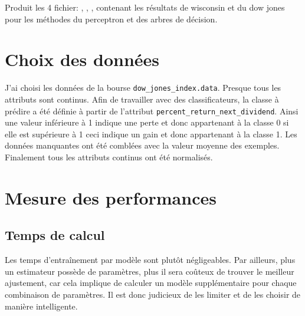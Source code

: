 \documentclass[10pt,letterpaper]{article}
\begin{document}
Produit les 4 fichier: , , ,  contenant les résultats de wisconsin et du dow jones pour les méthodes du perceptron et des arbres de décision.




\section*{Choix des données}
J’ai choisi les données de la bourse \verb!dow_jones_index.data!. Presque tous les attributs sont continus. Afin de travailler avec des classificateurs, la classe à prédire a été définie à partir de l’attribut \verb!percent_return_next_dividend!. Ainsi une valeur inférieure à 1 indique une perte et donc appartenant à la classe 0 si elle est supérieure à 1 ceci indique un gain et donc appartenant à la classe 1.
Les données manquantes ont été comblées avec la valeur moyenne des exemples. Finalement tous les attributs continus ont été normalisés.

\section*{Mesure des performances}
\subsection*{Temps de calcul}

Les temps d’entraînement par modèle sont plutôt négligeables.
Par ailleurs, plus un estimateur possède de paramètres, plus il sera coûteux de trouver le meilleur ajustement, car cela implique de calculer un modèle supplémentaire pour chaque combinaison de paramètres. Il est donc judicieux de les limiter et de les choisir de manière intelligente.
\end{document}
